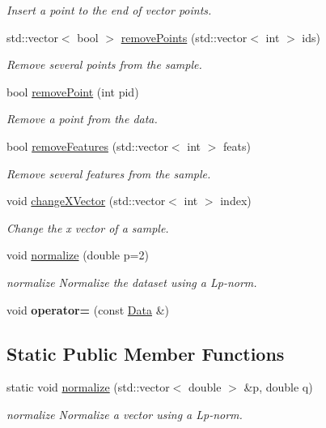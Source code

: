 \begin{DoxyCompactItemize}
\begin{DoxyCompactList}\small\item\em Insert a point to the end of vector points. \end{DoxyCompactList}\item 
std\+::vector$<$ bool $>$ \hyperlink{class_data_a6cc376e614e5440061c66833e1c8d30a}{remove\+Points} (std\+::vector$<$ int $>$ ids)
\begin{DoxyCompactList}\small\item\em Remove several points from the sample. \end{DoxyCompactList}\item 
bool \hyperlink{class_data_ad927494a13a5018ff3644212d7234a03}{remove\+Point} (int pid)
\begin{DoxyCompactList}\small\item\em Remove a point from the data. \end{DoxyCompactList}\item 
bool \hyperlink{class_data_a0e0136f31687452ff10b489f8804ceb8}{remove\+Features} (std\+::vector$<$ int $>$ feats)
\begin{DoxyCompactList}\small\item\em Remove several features from the sample. \end{DoxyCompactList}\item 
void \hyperlink{class_data_a3e66e3dce7675bf2a1eded906e3d7912}{change\+X\+Vector} (std\+::vector$<$ int $>$ index)
\begin{DoxyCompactList}\small\item\em Change the x vector of a sample. \end{DoxyCompactList}\item 
void \hyperlink{class_data_a38bbab57bd9d871bd78771df47529d6b}{normalize} (double p=2)
\begin{DoxyCompactList}\small\item\em normalize Normalize the dataset using a Lp-\/norm. \end{DoxyCompactList}\item 
\mbox{\label{class_data_a02affbc0f8564106c84dc59f34666912}} 
void {\bfseries operator=} (const \hyperlink{class_data}{Data} \&)
\end{DoxyCompactItemize}
\subsection*{Static Public Member Functions}
\begin{DoxyCompactItemize}
\item 
static void \hyperlink{class_data_acd8fd65a56a3d097d1bc19fb8249ee20}{normalize} (std\+::vector$<$ double $>$ \&p, double q)
\begin{DoxyCompactList}\small\item\em normalize Normalize a vector using a Lp-\/norm. \end{DoxyCompactList}\end{DoxyCompactItemize}
